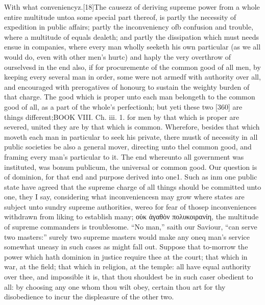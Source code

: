 With what conveniencyz.[18]The causezz of deriving supreme power from a whole entire multitude untoa some special part thereof, is partly the necessity of expedition in public affairs; partly the inconveniency ofb confusion and trouble, where a multitude of equals dealeth; and partly the dissipation which must needs ensue in companies, where every man wholly seeketh his own particular (as we all would do, even with other men’s hurtc) and haply the very overthrow of ourselvesd in the end also, if for procuremente of the common good of all men, by keeping every several man in order, some were not armedf with authority over all, and encouraged with prerogatives of honourg to sustain the weighty burden of that charge. The good which is proper unto each man belongeth to the common good of all, as a part of the whole’s perfectionh; but yeti these two [360] are things different;BOOK VIII. Ch. iii. 1. for men by that which is proper are severed, united they are by that which is common. Wherefore, besides that which moveth each man in particular to seek his private, there mustk of necessity in all public societies be also a general mover, directing unto thel common good, and framing every man’s particular to it. The end whereunto all government was instituted, was bonum publicum, the universal or common good. Our question is of dominion, for that end and purpose derived into one1. Such as inm one public state have agreed that the supreme charge of all things should be committed unto one, they I say, considering what inconveniencesn may grow where states are subject unto sundry supreme authorities, wereo for fear of thosep inconveniences withdrawn from liking to establish many; οὐκ ἀγαθὸν πολυκοιρανίη, the multitude of supreme commanders is troublesome. “No man,” saith our Saviour, “can serve two masters:” surely two supreme masters would make any oneq man’s service somewhat uneasy in such cases as might fall out. Suppose that to-morrow the power which hath dominion in justice require thee at the court; that which in war, at the field; that which in religion, at the temple: all have equal authority over thee, and impossible it is, that thou shouldest be in such caser obedient to all: by choosing any one whom thou wilt obey, certain thou art for thy disobedience to incur the displeasure of the other two.


